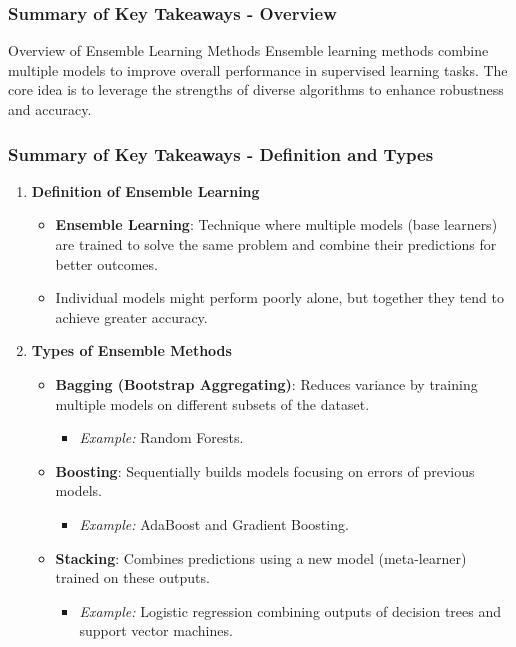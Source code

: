 \documentclass[aspectratio=169]{beamer}
\begin{document}
\begin{frame}[fragile]
    \frametitle{Summary of Key Takeaways - Overview}
    \begin{block}{Overview of Ensemble Learning Methods}
        Ensemble learning methods combine multiple models to improve overall performance in supervised learning tasks. 
        The core idea is to leverage the strengths of diverse algorithms to enhance robustness and accuracy.
    \end{block}
\end{frame}

\begin{frame}[fragile]
    \frametitle{Summary of Key Takeaways - Definition and Types}
    \begin{enumerate}
        \item \textbf{Definition of Ensemble Learning}
        \begin{itemize}
            \item \textbf{Ensemble Learning}: Technique where multiple models (base learners) are trained to solve the same problem and combine their predictions for better outcomes.
            \item Individual models might perform poorly alone, but together they tend to achieve greater accuracy.
        \end{itemize}

        \item \textbf{Types of Ensemble Methods}
        \begin{itemize}
            \item \textbf{Bagging (Bootstrap Aggregating)}: Reduces variance by training multiple models on different subsets of the dataset. 
            \begin{itemize}
                \item \textit{Example:} Random Forests.
            \end{itemize}
    
            \item \textbf{Boosting}: Sequentially builds models focusing on errors of previous models. 
            \begin{itemize}
                \item \textit{Example:} AdaBoost and Gradient Boosting.
            \end{itemize}
    
            \item \textbf{Stacking}: Combines predictions using a new model (meta-learner) trained on these outputs. 
            \begin{itemize}
                \item \textit{Example:} Logistic regression combining outputs of decision trees and support vector machines.
            \end{itemize}
        \end{itemize}
    \end{enumerate}
\end{frame}
\end{document}
